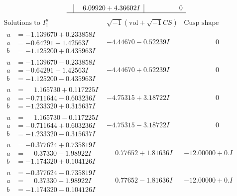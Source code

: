 \documentclass[1p]{elsarticle_modified}
\theoremstyle{definition}
\newcommand{\I}{\sqrt{-1}}
\begin{document}
$$\begin{array}{c|c|c}
 & \phantom{-}6.09920 + 4.36602 I & \phantom{-0.000000 } 0\\
 \hline 
 \end{array}$$\newpage$$\begin{array}{c|c|c}  
\text{Solutions to }I^u_{1}& \I (\text{vol} + \sqrt{-1}CS) & \text{Cusp shape}\\
 \hline 
\begin{aligned}
u &= -1.139670 + 0.233858 I \\
a &= -0.64291 - 1.42563 I \\
b &= -1.125200 + 0.435963 I\end{aligned}
 & -4.44670 - 0.52239 I & \phantom{-0.000000 } 0 \\ \hline\begin{aligned}
u &= -1.139670 - 0.233858 I \\
a &= -0.64291 + 1.42563 I \\
b &= -1.125200 - 0.435963 I\end{aligned}
 & -4.44670 + 0.52239 I & \phantom{-0.000000 } 0 \\ \hline\begin{aligned}
u &= \phantom{-}1.165730 + 0.117225 I \\
a &= -0.711644 - 0.603236 I \\
b &= -1.233320 + 0.315637 I\end{aligned}
 & -4.75315 + 3.18722 I & \phantom{-0.000000 } 0 \\ \hline\begin{aligned}
u &= \phantom{-}1.165730 - 0.117225 I \\
a &= -0.711644 + 0.603236 I \\
b &= -1.233320 - 0.315637 I\end{aligned}
 & -4.75315 - 3.18722 I & \phantom{-0.000000 } 0 \\ \hline\begin{aligned}
u &= -0.377624 + 0.735819 I \\
a &= \phantom{-}0.37330 - 1.98922 I \\
b &= -1.174320 + 0.104126 I\end{aligned}
 & \phantom{-}0.77652 + 1.81636 I & -12.00000 + 0. I\phantom{ +0.000000I} \\ \hline\begin{aligned}
u &= -0.377624 - 0.735819 I \\
a &= \phantom{-}0.37330 + 1.98922 I \\
b &= -1.174320 - 0.104126 I\end{aligned}
 & \phantom{-}0.77652 - 1.81636 I & -12.00000 + 0. I\phantom{ +0.000000I} \\ \hline\begin{aligned}

\end{aligned}
\end{array}$$
\end{document}
